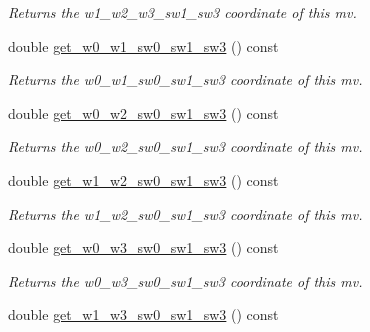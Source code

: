 \begin{DoxyCompactItemize}
\begin{DoxyCompactList}\small\item\em Returns the w1\-\_\-w2\-\_\-w3\-\_\-sw1\-\_\-sw3 coordinate of this mv. \end{DoxyCompactList}\item 
\hypertarget{classe3ga_1_1mv_ab9b9b6341d724e1a68ad296931b22720}{double \hyperlink{classe3ga_1_1mv_ab9b9b6341d724e1a68ad296931b22720}{get\-\_\-w0\-\_\-w1\-\_\-sw0\-\_\-sw1\-\_\-sw3} () const }\label{classe3ga_1_1mv_ab9b9b6341d724e1a68ad296931b22720}

\begin{DoxyCompactList}\small\item\em Returns the w0\-\_\-w1\-\_\-sw0\-\_\-sw1\-\_\-sw3 coordinate of this mv. \end{DoxyCompactList}\item 
\hypertarget{classe3ga_1_1mv_a49f6b41fcc2a17c2cdf4082dd3bb93b1}{double \hyperlink{classe3ga_1_1mv_a49f6b41fcc2a17c2cdf4082dd3bb93b1}{get\-\_\-w0\-\_\-w2\-\_\-sw0\-\_\-sw1\-\_\-sw3} () const }\label{classe3ga_1_1mv_a49f6b41fcc2a17c2cdf4082dd3bb93b1}

\begin{DoxyCompactList}\small\item\em Returns the w0\-\_\-w2\-\_\-sw0\-\_\-sw1\-\_\-sw3 coordinate of this mv. \end{DoxyCompactList}\item 
\hypertarget{classe3ga_1_1mv_aeac3e01fd7a7b19cee6617ef0bfee6d7}{double \hyperlink{classe3ga_1_1mv_aeac3e01fd7a7b19cee6617ef0bfee6d7}{get\-\_\-w1\-\_\-w2\-\_\-sw0\-\_\-sw1\-\_\-sw3} () const }\label{classe3ga_1_1mv_aeac3e01fd7a7b19cee6617ef0bfee6d7}

\begin{DoxyCompactList}\small\item\em Returns the w1\-\_\-w2\-\_\-sw0\-\_\-sw1\-\_\-sw3 coordinate of this mv. \end{DoxyCompactList}\item 
\hypertarget{classe3ga_1_1mv_a1167f398e7fc6e9f77aed45f022723b0}{double \hyperlink{classe3ga_1_1mv_a1167f398e7fc6e9f77aed45f022723b0}{get\-\_\-w0\-\_\-w3\-\_\-sw0\-\_\-sw1\-\_\-sw3} () const }\label{classe3ga_1_1mv_a1167f398e7fc6e9f77aed45f022723b0}

\begin{DoxyCompactList}\small\item\em Returns the w0\-\_\-w3\-\_\-sw0\-\_\-sw1\-\_\-sw3 coordinate of this mv. \end{DoxyCompactList}\item 
\hypertarget{classe3ga_1_1mv_adaf2c7462e41c7ae279d84eb9e2ea505}{double \hyperlink{classe3ga_1_1mv_adaf2c7462e41c7ae279d84eb9e2ea505}{get\-\_\-w1\-\_\-w3\-\_\-sw0\-\_\-sw1\-\_\-sw3} () const }\label{classe3ga_1_1mv_adaf2c7462e41c7ae279d84eb9e2ea505}


\end{DoxyCompactItemize}
